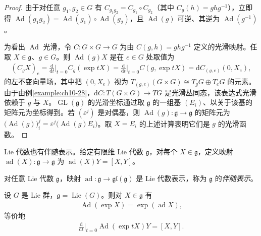 \documentclass[../../main.tex]{subfiles}
\begin{document}
\begin{proof}
由于对任意 $g_1,g_2\in G$ 有 $C_{g_1g_2}=C_{g_1}\circ C_{g_2}$（其中 $C_g(h)=ghg^{-1}$），立即得 $\operatorname{Ad}(g_1g_2)=\operatorname{Ad}(g_1)\circ\operatorname{Ad}(g_2)$，且 $\operatorname{Ad}(g)$ 可逆、其逆为 $\operatorname{Ad}(g^{-1})$。

为看出 $\operatorname{Ad}$ 光滑，令 $C\colon G\times G\to G$ 为由 $C(g,h)=ghg^{-1}$ 定义的光滑映射。任取 $X\in\mathfrak g$、$g\in G$。则 $\operatorname{Ad}(g)X$ 是在 $e\in G$ 处取值为
\begin{align*}
(C_gX)_e=\frac{\mathrm{d}}{\mathrm{d}t}\bigg|_{t=0}C_g(\exp tX)=\frac{\mathrm{d}}{\mathrm{d}t}\bigg|_{t=0}C(g,\exp tX)=\mathrm{d}C_{(g,e)}(0,X_e),
\end{align*}
的左不变向量场，其中把 $(0,X_e)$ 视为 $T_{(g,e)}(G\times G)\cong T_gG\oplus T_eG$ 的元素。由于由例\cref{example:ch10-28}，$\mathrm{d}C\colon T(G\times G)\to TG$ 是光滑丛同态，该表达式光滑依赖于 $g$ 与 $X$。$\operatorname{GL}(\mathfrak g)$ 的光滑坐标通过取 $\mathfrak g$ 的一组基 $(E_i)$、以关于该基的矩阵元为坐标得到。若 $(\varepsilon^j)$ 是对偶基，则 $\operatorname{Ad}(g)\colon\mathfrak g\to\mathfrak g$ 的矩阵元为 $\bigl(\operatorname{Ad}(g)\bigr)^j_i=\varepsilon^j\bigl(\operatorname{Ad}(g)E_i\bigr)$。取 $X=E_i$ 的上述计算表明它们是 $g$ 的光滑函数。
\end{proof}

Lie 代数也有伴随表示。给定有限维 Lie 代数 $\mathfrak g$，对每个 $X\in\mathfrak g$，定义映射 $\operatorname{ad}(X)\colon\mathfrak g\to\mathfrak g$ 为 $\operatorname{ad}(X)Y=[X,Y]$。

\begin{proposition}\label{proposition:ch20-代数伴随表示}
对任意 Lie 代数 $\mathfrak g$，映射 $\operatorname{ad}\colon\mathfrak g\to\mathfrak{gl}(\mathfrak g)$ 是 Lie 代数表示，称为 $\mathfrak g$ 的\emph{伴随表示}。
\end{proposition}

\begin{theorem}\label{theorem:ch20-ad与Ad}
设 $G$ 是 Lie 群，$\mathfrak g=\operatorname{Lie}(G)$。则对 $X\in\mathfrak g$ 有
\begin{align}
\operatorname{Ad}(\exp X)=\exp(\operatorname{ad}X),
\end{align}
等价地
\begin{align}
\frac{\mathrm{d}}{\mathrm{d}t}\bigg|_{t=0}\operatorname{Ad}(\exp tX)Y=[X,Y].
\end{align}
\end{theorem}
\end{document}
